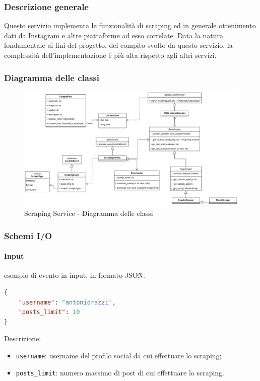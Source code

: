 \subsubsection{Descrizione generale}
Questo servizio implementa le funzionalità di scraping ed in generale ottenimento dati da Instagram
e altre piattaforme ad esso correlate. Data la natura fondamentale ai fini del progetto, del compito
svolto da questo servizio, la complessità dell'implementazione è più alta rispetto agli altri servizi.

\subsubsection{Diagramma delle classi}
\begin{figure}[H]
    \includegraphics[width=14cm]{sezioni/images/cd_scraping.png}
    \centering
    \caption{Scraping Service - Diagramma delle classi}
\end{figure}

\subsubsection{Schemi I/O}
\paragraph*{Input} esempio di evento in input, in formato JSON\G{}.
\begin{lstlisting}[language=JSON]
{
    "username": "antoniorazzi",
    "posts_limit": 10
}
\end{lstlisting}
Descrizione:
\begin{itemize}
    \item \verb|username|: username del profilo social da cui effettuare lo scraping;
    \item \verb|posts_limit|: numero massimo di post di cui effettuare lo scraping. 
\end{itemize}

